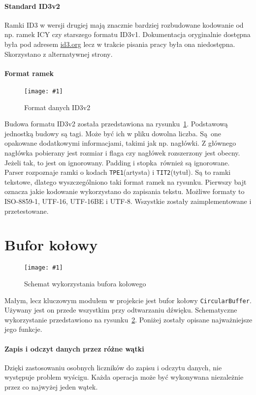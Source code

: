 \documentclass[polish]{aghengthesis}
\newcommand{\imgint}[4]{
	\begin{figure}[{#4}]
		\centering
		\texttt{[image: \#1]}
		\caption{#2}
		\label{#1}
	\end{figure}
}
\newcommand{\imgcs}[3]{\imgint{#1}{#2}{#3}{}}
\begin{document}
			\paragraph{Standard ID3v2}
			Ramki ID3 w wersji drugiej mają znacznie bardziej rozbudowane kodowanie od np. ramek ICY czy starszego formatu ID3v1. Dokumentacja oryginalnie dostępna była pod adresem \href{id3.org}{id3.org} lecz w trakcie pisania pracy była ona niedostępna. Skorzystano z alternatywnej strony\textsuperscript{\cite{id3_spec_mutagen}}.
			
			\paragraph{Format ramek}
			\imgcs{3/PicoRadio-id3}{Format danych ID3v2}{0.8}
			Budowa formatu ID3v2 została przedstawiona na rysunku~\ref{3/PicoRadio-id3}. Podstawową jednostką budowy są tagi. Może być ich w pliku dowolna liczba. Są one opakowane dodatkowymi informacjami, takimi jak np. nagłówki. Z głównego nagłówka pobierany jest rozmiar i flaga czy nagłówek rozszerzony jest obecny. Jeżeli tak, to jest on ignorowany. Padding i stopka również są ignorowane.
			$ $\\
			
			Parser rozpoznaje ramki o kodach \lstinline|TPE1|(artysta) i \lstinline|TIT2|(tytuł). Są to ramki tekstowe, dlatego wyszczególniono taki format ramek na rysunku. Pierwszy bajt oznacza jakie kodowanie wykorzystano do zapisania tekstu. Możliwe formaty to ISO-8859-1, UTF-16, UTF-16BE i UTF-8. Wszystkie zostały zaimplementowane i przetestowane.
	
	\section{Bufor kołowy}
		\label{sec:circular_buffer}
		\imgcs{3/PicoRadio-buffer}{Schemat wykorzystania bufora kołowego}{0.8}
		Małym, lecz kluczowym modułem w projekcie jest bufor kołowy \lstinline|CircularBuffer|. Używany jest on przede wszystkim przy odtwarzaniu dźwięku. Schematyczne wykorzystanie przedstawiono na rysunku~\ref{3/PicoRadio-buffer}. Poniżej zostały opisane najważniejsze jego funkcje.
		
		\paragraph{Zapis i odczyt danych przez różne wątki}
			Dzięki zastosowaniu osobnych liczników do zapisu i odczytu danych, nie występuje problem wyścigu. Każda operacja może być wykonywana niezależnie przez co najwyżej jeden wątek.
			
\end{document}
